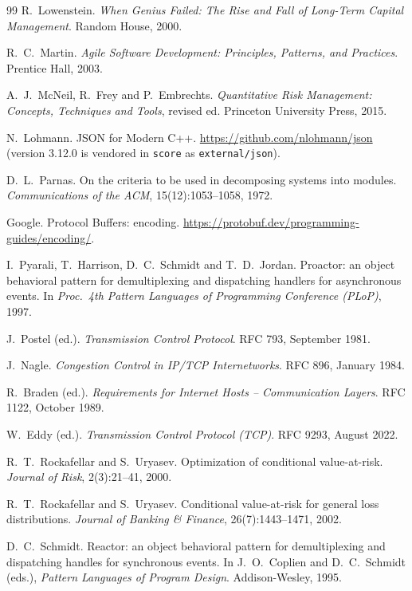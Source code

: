 \begin{thebibliography}{99}
 R.~Lowenstein. \emph{When Genius Failed: The Rise and Fall of Long-Term Capital Management}. Random House, 2000.

 R.~C.~Martin. \emph{Agile Software Development: Principles, Patterns, and Practices}. Prentice Hall, 2003.

 A.~J.~McNeil, R.~Frey and P.~Embrechts. \emph{Quantitative Risk Management: Concepts, Techniques and Tools}, revised ed. Princeton University Press, 2015.

 N.~Lohmann. JSON for Modern C++. \url{https://github.com/nlohmann/json} (version 3.12.0 is vendored in \texttt{score} as \texttt{external/json}).

 D.~L.~Parnas. On the criteria to be used in decomposing systems into modules. \emph{Communications of the ACM}, 15(12):1053--1058, 1972.

 Google. Protocol Buffers: encoding. \url{https://protobuf.dev/programming-guides/encoding/}.

 I.~Pyarali, T.~Harrison, D.~C.~Schmidt and T.~D.~Jordan. Proactor: an object behavioral pattern for demultiplexing and dispatching handlers for asynchronous events. In \emph{Proc.\ 4th Pattern Languages of Programming Conference (PLoP)}, 1997.

 J.~Postel (ed.). \emph{Transmission Control Protocol}. RFC 793, September 1981.

 J.~Nagle. \emph{Congestion Control in IP/TCP Internetworks}. RFC 896, January 1984.

 R.~Braden (ed.). \emph{Requirements for Internet Hosts -- Communication Layers}. RFC 1122, October 1989.

 W.~Eddy (ed.). \emph{Transmission Control Protocol (TCP)}. RFC 9293, August 2022.

 R.~T.~Rockafellar and S.~Uryasev. Optimization of conditional value-at-risk. \emph{Journal of Risk}, 2(3):21--41, 2000.

 R.~T.~Rockafellar and S.~Uryasev. Conditional value-at-risk for general loss distributions. \emph{Journal of Banking \& Finance}, 26(7):1443--1471, 2002.

 D.~C.~Schmidt. Reactor: an object behavioral pattern for demultiplexing and dispatching handles for synchronous events. In J.~O.~Coplien and D.~C.~Schmidt (eds.), \emph{Pattern Languages of Program Design}. Addison-Wesley, 1995.


\end{thebibliography}
